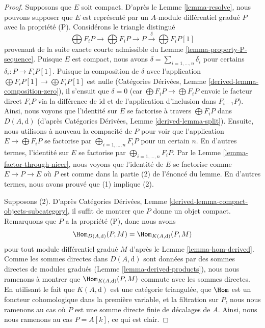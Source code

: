 \begin{proof}
Supposons que $E$ soit compact. D'après le Lemme \ref{lemma-resolve}, nous pouvons
supposer que $E$ est représenté par un $A$-module différentiel gradué $P$ avec la
propriété (P). Considérons le triangle distingué
$$
\bigoplus F_iP \to \bigoplus F_iP \to P
\xrightarrow{\delta} \bigoplus F_iP[1]
$$
provenant de la suite exacte courte admissible du Lemme
\ref{lemma-property-P-sequence}. Puisque $E$ est compact, nous avons $\delta =
\sum_{i = 1, \ldots, n} \delta_i$ pour certains $\delta_i : P \to F_iP[1]$.
Puisque la composition de $\delta$ avec l'application $\bigoplus F_iP[1] \to
\bigoplus F_iP[1]$ est nulle (Catégories Dérivées, Lemme
\ref{derived-lemma-composition-zero}), il s'ensuit que $\delta = 0$ (car
$\bigoplus F_iP \to \bigoplus F_iP$ envoie le facteur direct $F_iP$ via la
différence de $\text{id}$ et de l'application d'inclusion dans $F_{i - 1}P$). Ainsi,
nous voyons que l'identité sur $E$ se factorise à travers $\bigoplus F_iP$ dans
$D(A, \text{d})$ (d'après Catégories Dérivées, Lemme \ref{derived-lemma-split}).
Ensuite, nous utilisons à nouveau la compacité de $P$ pour voir que
l'application $E \to \bigoplus F_iP$ se factorise par $\bigoplus_{i = 1, \ldots,
n} F_iP$ pour un certain $n$. En d'autres termes, l'identité sur $E$ se factorise
par $\bigoplus_{i = 1, \ldots, n} F_iP$. Par le Lemme
\ref{lemma-factor-through-nicer}, nous voyons que l'identité de $E$ se factorise
comme $E \to P \to E$ où $P$ est comme dans la partie (2) de l'énoncé du lemme. En
d'autres termes, nous avons prouvé que (1) implique (2).

\medskip\noindent
Supposons (2). D'après Catégories Dérivées, Lemme
\ref{derived-lemma-compact-objects-subcategory}, il suffit de montrer que $P$
donne un objet compact. Remarquons que $P$ a la propriété (P), donc nous avons
$$
\Hom_{D(A, \text{d})}(P, M) = \Hom_{K(A, \text{d})}(P, M)
$$
pour tout module différentiel gradué $M$ d'après le Lemme \ref{lemma-hom-derived}.
Comme les sommes directes dans $D(A, \text{d})$ sont données par des sommes
directes de modules gradués (Lemme \ref{lemma-derived-products}), nous nous ramenons à
montrer que $\Hom_{K(A, \text{d})}(P, M)$ commute avec les sommes directes. En
utilisant le fait que $K(A, \text{d})$ est une catégorie triangulée, que $\Hom$
est un foncteur cohomologique dans la première variable, et la filtration sur $P$,
nous nous ramenons au cas où $P$ est une somme directe finie de décalages de $A$.
Ainsi, nous nous ramenons au cas $P = A[k]$, ce qui est clair.
\end{proof}

